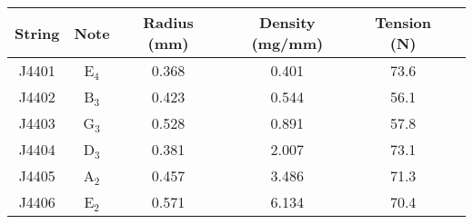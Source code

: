 \begin{tabular}{cccccc}
\toprule
String & Note & Radius (mm) & Density (mg/mm) & Tension (N) \\
\midrule
J4401 & E$_{4}$ & 0.368 & 0.401 & 73.6 \\
J4402 & B$_{3}$ & 0.423 & 0.544 & 56.1 \\
J4403 & G$_{3}$ & 0.528 & 0.891 & 57.8 \\
J4404 & D$_{3}$ & 0.381 & 2.007 & 73.1 \\
J4405 & A$_{2}$ & 0.457 & 3.486 & 71.3 \\
J4406 & E$_{2}$ & 0.571 & 6.134 & 70.4 \\
\bottomrule
\end{tabular}

